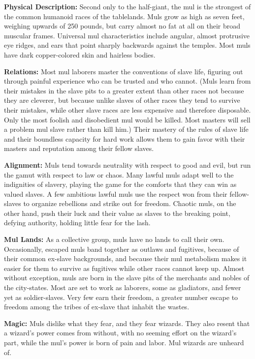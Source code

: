 \textbf{Physical Description:} Second only to the half-giant, the mul is the strongest of the common humanoid races of the tablelands. Muls grow as high as seven feet, weighing upwards of 250 pounds, but carry almost no fat at all on their broad muscular frames. Universal mul characteristics include angular, almost protrusive eye ridges, and ears that point sharply backwards against the temples. Most muls have dark copper-colored skin and hairless bodies.

\textbf{Relations:} Most mul laborers master the conventions of slave life, figuring out through painful experience who can be trusted and who cannot. (Muls learn from their mistakes in the slave pits to a greater extent than other races not because they are cleverer, but because unlike slaves of other races they tend to survive their mistakes, while other slave races are less expensive and therefore disposable. Only the most foolish and disobedient mul would be killed. Most masters will sell a problem mul slave rather than kill him.) Their mastery of the rules of slave life and their boundless capacity for hard work allows them to gain favor with their masters and reputation among their fellow slaves.

\textbf{Alignment:} Muls tend towards neutrality with respect to good and evil, but run the gamut with respect to law or chaos. Many lawful muls adapt well to the indignities of slavery, playing the game for the comforts that they can win as valued slaves. A few ambitious lawful muls use the respect won from their fellow-slaves to organize rebellions and strike out for freedom. Chaotic muls, on the other hand, push their luck and their value as slaves to the breaking point, defying authority, holding little fear for the lash.

\textbf{Mul Lands:} As a collective group, muls have no lands to call their own. Occasionally, escaped muls band together as outlaws and fugitives, because of their common ex-slave backgrounds, and because their mul metabolism makes it easier for them to survive as fugitives while other races cannot keep up. Almost without exception, muls are born in the slave pits of the merchants and nobles of the city-states. Most are set to work as laborers, some as gladiators, and fewer yet as soldier-slaves. Very few earn their freedom, a greater number escape to freedom among the tribes of ex-slave that inhabit the wastes.

\textbf{Magic:} Muls dislike what they fear, and they fear wizards. They also resent that a wizard's power comes from without, with no seeming effort on the wizard's part, while the mul's power is born of pain and labor. Mul wizards are unheard of.

